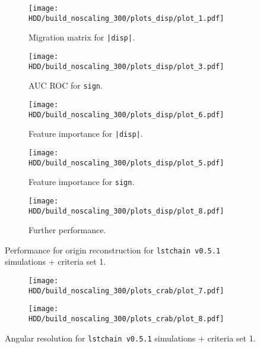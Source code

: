 \begin{figure}
    \centering
    \begin{subfigure}{0.49\textwidth}
        \centering
        \texttt{[image: HDD/build\_noscaling\_300/plots\_disp/plot\_1.pdf]}
        \caption{Migration matrix for \texttt{|disp|}.}
        \label{fig:origin_oldMC_300_1}
    \end{subfigure}
    \hfill
    \begin{subfigure}{0.49\textwidth}
        \centering
        \texttt{[image: HDD/build\_noscaling\_300/plots\_disp/plot\_3.pdf]}
        \caption{AUC ROC for \texttt{sign}.}
        \label{fig:origin_oldMC_300_2}
    \end{subfigure}
    \newline\vfill
    \begin{subfigure}{0.49\textwidth}
        \centering
        \texttt{[image: HDD/build\_noscaling\_300/plots\_disp/plot\_6.pdf]}
        \caption{Feature importance for \texttt{|disp|}.}
        \label{fig:origin_oldMC_300_3}
    \end{subfigure}
    \hfill
    \begin{subfigure}{0.49\textwidth}
        \centering
        \texttt{[image: HDD/build\_noscaling\_300/plots\_disp/plot\_5.pdf]}
        \caption{Feature importance for \texttt{sign}.}
        \label{fig:origin_oldMC_300_4}
    \end{subfigure}
    \newline\vfill
    \begin{subfigure}{0.49\textwidth}
        \centering
        \texttt{[image: HDD/build\_noscaling\_300/plots\_disp/plot\_8.pdf]}
        \caption{Further performance.}
        \label{fig:origin_oldMC_300_4}
    \end{subfigure}
    \caption{Performance for origin reconstruction for \texttt{lstchain v0.5.1} simulations + criteria set 1.}
\end{figure}

\begin{figure}
    \centering
    \begin{subfigure}{0.49\textwidth}
        \centering
        \texttt{[image: HDD/build\_noscaling\_300/plots\_crab/plot\_7.pdf]}
        \label{fig:ang_res_oldMC_300_1}
    \end{subfigure}
    \hfill
    \begin{subfigure}{0.49\textwidth}
        \centering
        \texttt{[image: HDD/build\_noscaling\_300/plots\_crab/plot\_8.pdf]}
        \label{fig:ang_res_oldMC_300_2}
    \end{subfigure}
    \caption{Angular resolution for \texttt{lstchain v0.5.1} simulations + criteria set 1.}
\end{figure}

